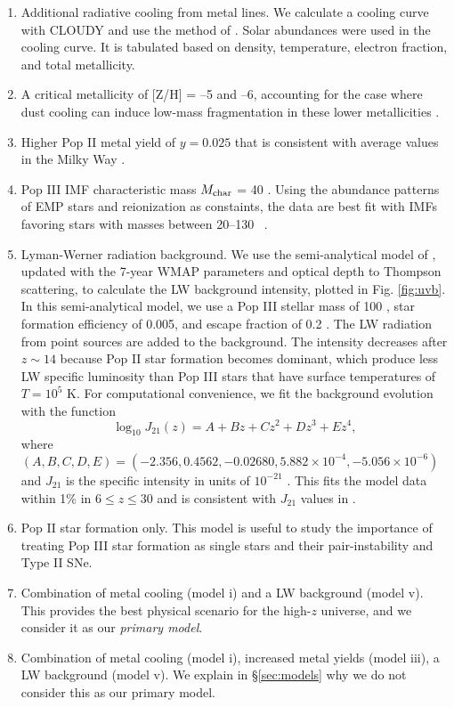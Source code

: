 \documentclass[useAMS,usenatbib]{mn2e}
\begin{document}
\begin{enumerate}
\item Additional radiative cooling from metal lines.  We calculate a
  cooling curve with CLOUDY \citep{CLOUDY} and use the method of
  \citep{2008MNRAS.385.1443S}.  Solar abundances were used in the
  cooling curve.  It is tabulated based on density, temperature,
  electron fraction, and total metallicity.
\item A critical metallicity of [Z/H] = --5 and --6, accounting for
  the case where dust cooling can induce low-mass fragmentation in
  these lower metallicities \citep{Omukai05, Schneider06_Frag}.
\item Higher Pop II metal yield of $y = 0.025$ that is consistent with
  average values in the Milky Way \citep{Madau96}.
\item Pop III IMF characteristic mass $M_{\rm char}$ = 40 \Ms.  Using
  the abundance patterns of EMP stars and reionization as constaints,
  the data are best fit with IMFs favoring stars with masses between
  20--130 \Ms~\citep{Umeda03, Tumlinson06}.
\item Lyman-Werner radiation background.  We use the semi-analytical
  model of \citet{Wise05}, updated with the 7-year WMAP parameters and
  optical depth to Thompson scattering, to calculate the LW background
  intensity, plotted in Fig. \ref{fig:uvb}.  In this semi-analytical
  model, we use a Pop III stellar mass of 100 \Ms, star formation
  efficiency of 0.005, and escape fraction of 0.2 \citep{Wise09}.  The
  LW radiation from point sources are added to the background.  The
  intensity decreases after $z \sim 14$ because Pop II star formation
  becomes dominant, which produce less LW specific luminosity than Pop
  III stars that have surface temperatures of $T = 10^5$ K.  For
  computational convenience, we fit the background evolution with the
  function
%
  \begin{equation}
    \label{eqn:uvb}
    \log_{10} J_{21}(z) = A + Bz + Cz^2 + Dz^3 + Ez^4,
  \end{equation}
%
  where $(A,B,C,D,E) = (-2.356, 0.4562, -0.02680, 5.882 \times 10^{-4},
  -5.056 \times 10^{-6})$ and $J_{21}$ is the specific intensity in
  units of $10^{-21}$ \emis.  This fits the
  model data within 1\% in $6 \le z \le 30$ and is consistent with
  $J_{21}$ values in \citet{Trenti09_SFR}.
\item Pop II star formation only.  This model is useful to study the
  importance of treating Pop III star formation as single stars and
  their pair-instability and Type II SNe.
\item Combination of metal cooling (model i) and a LW background
  (model v).  This provides the best physical scenario for the
  high-$z$ universe, and we consider it as our \textit{primary model}.
\item Combination of metal cooling (model i), increased metal yields
  (model iii), a LW background (model v).  We explain in
  \S\ref{sec:models} why we do not consider this as our primary model.
\end{enumerate}
\end{document}
